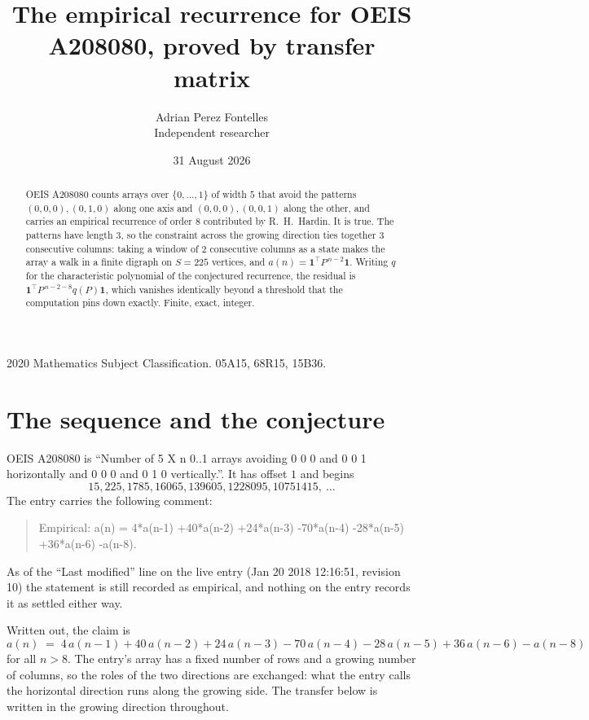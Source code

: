 \documentclass[11pt,a4paper]{article}
\title{The empirical recurrence for OEIS A208080, proved by transfer matrix}
\author{Adrian Perez Fontelles\\ \small Independent researcher}
\date{31 August 2026}
\theoremstyle{plain}
\theoremstyle{definition}
\begin{document}
\maketitle

\begin{abstract}
OEIS A208080 counts arrays over $\{0,\dots,1\}$ of width $5$ that avoid the patterns
$(0,0,0), (0,1,0)$ along one axis and $(0,0,0), (0,0,1)$ along the other, and carries an empirical recurrence of
order $8$ contributed by R.~H.~Hardin. It is true. The patterns have length $3$, so
the constraint across the growing direction ties together $3$ consecutive columns: taking a
window of $2$ consecutive columns as a state makes the array a walk in a finite digraph
on $S=225$ vertices, and $a(n)=\mathbf{1}^{\!\top}P^{\,n-2}\mathbf{1}$. Writing $q$
for the characteristic polynomial of the conjectured recurrence, the residual is
$\mathbf{1}^{\!\top}P^{\,n-2-8}q(P)\mathbf{1}$, which vanishes identically
beyond a threshold that the computation pins down exactly. Finite, exact, integer.
\end{abstract}

\noindent\small 2020 Mathematics Subject Classification. 05A15, 68R15, 15B36.\normalsize

\section{The sequence and the conjecture}

OEIS A208080 is ``Number of 5 X n 0..1 arrays avoiding 0 0 0 and 0 0 1 horizontally and 0 0 0 and 0 1 0 vertically.''. It has offset
$1$ and begins
\[
15, 225, 1785, 16065, 139605, 1228095, 10751415,\ \dots
\]
The entry carries the following comment:
\begin{quote}\small
Empirical: a(n) = 4*a(n-1) +40*a(n-2) +24*a(n-3) -70*a(n-4) -28*a(n-5) +36*a(n-6) -a(n-8).
\end{quote}
As of the ``Last modified'' line on the live entry (Jan 20 2018 12:16:51, revision
10) the statement is still recorded as empirical, and nothing on the entry
records it as settled either way.

Written out, the claim is
\begin{equation}\label{eq:conj}
a(n)\;=\;4\,a(n-1) + 40\,a(n-2) + 24\,a(n-3) - 70\,a(n-4) - 28\,a(n-5) + 36\,a(n-6) - a(n-8)
\end{equation}
for all $n>8$. The entry's array has a fixed number of rows and a growing number of
columns, so the roles of the two directions are exchanged: what the entry calls the
horizontal direction runs along the growing side. The transfer below is written in the
growing direction throughout.
\end{document}
